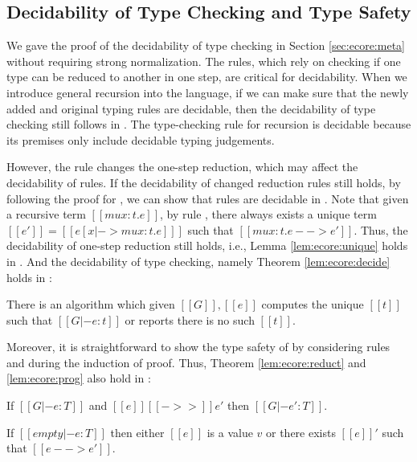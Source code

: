\subsection{Decidability of Type Checking and Type Safety}\label{sec:rec:meta}
We gave the proof of the decidability of type checking \ecore in
Section \ref{sec:ecore:meta} without requiring strong normalization. The
\cast rules, which rely on checking if
one type can be reduced to another in one step, are critical for decidability. When we introduce
general recursion into the language, if we can make sure that the newly
added and original typing rules are decidable, then the decidability
of type checking still follows in \name.
The type-checking rule  for 
recursion is decidable because its premises only include
decidable typing judgements. 

However, the rule  changes
the one-step reduction, which may affect the decidability of \cast
rules. If the decidability of changed reduction rules still holds, by
following the proof for \ecore, we can show that \cast
rules are decidable in \name. Note that given a recursive term
$[[mu x:t.e]]$, by rule , there always exists a unique
term $[[e']]=[[e[x|->mu x:t.e] ]]$ such that $[[mu x:t.e -->
    e']]$. Thus, the decidability of one-step reduction still holds,
i.e., Lemma \ref{lem:ecore:unique} holds in \name. And the decidability
of type checking, namely Theorem \ref{lem:ecore:decide} holds in \name:

\begin{thm}\label{lem:rec:decide}
	There is an algorithm which given $[[G]], [[e]]$ computes the
        unique $[[t]]$ such that $[[G |- e:t]]$ or reports there is no
        such $[[t]]$.
\end{thm}

Moreover, it is straightforward to show the type safety of \name by
considering rules  and  during the
induction of proof. Thus, Theorem \ref{lem:ecore:reduct} and
\ref{lem:ecore:prog} also hold in \name:

\begin{thm}\label{lem:rec:reduct}
If $[[G |- e:T]]$ and $[[e]] [[->>]] e'$ then $[[G |- e':T]]$.
\end{thm}

\begin{thm}\label{lem:rec:prog}
If $[[empty |- e:T]]$ then either $[[e]]$ is a value $v$ or there
exists $[[e]]'$ such that $[[e --> e']]$.
\end{thm}
